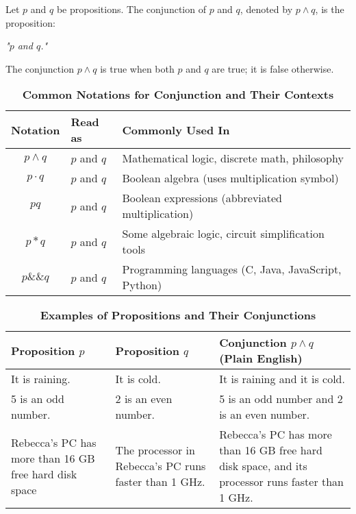 \vspace{5pt}
\begin{tcolorbox}[title=Definition: Conjunction]
Let $p$ and $q$ be propositions. The conjunction of $p$ and $q$, denoted by $p \land q$, is the proposition:  
\begin{center}
\textit{"$p$ and $q$."}
\end{center}
The conjunction $p \land q$ is true when both $p$ and $q$ are true; it is false otherwise.
\end{tcolorbox}
\begin{table}[h!]
\centering
\caption*{\textbf{Common Notations for Conjunction and Their Contexts}}
\begin{tabular}{|c|l|l|}
\hline
\rowcolor{gray!20}
\textbf{Notation} & \textbf{Read as} & \textbf{Commonly Used In} \\
\hline
$p \land q$ & $p$ and $q$ & Mathematical logic, discrete math, philosophy \\
$p \cdot q$ & $p$ and $q$ & Boolean algebra (uses multiplication symbol) \\
$pq$ & $p$ and $q$ & Boolean expressions (abbreviated multiplication) \\
$p * q$ & $p$ and $q$ & Some algebraic logic, circuit simplification tools \\
$p \&\& q$ & $p$ and $q$ & Programming languages (C, Java, JavaScript, Python) \\
\hline
\end{tabular}
\end{table}
\begin{table}[h!]
\centering
\caption*{\textbf{Examples of Propositions and Their Conjunctions}}
\begin{tabular}{|p{4.5cm}|p{4.5cm}|p{6cm}|}
\hline
\rowcolor{gray!20}
\textbf{Proposition $p$} & \textbf{Proposition $q$} & \textbf{Conjunction $p \land q$ (Plain English)} \\
\hline
It is raining. & It is cold. & It is raining and it is cold. \\
5 is an odd number. & 2 is an even number. & 5 is an odd number and 2 is an even number. \\
\hline
Rebecca’s PC has more than 16 GB free hard disk space & The processor in Rebecca’s PC runs faster than 1 GHz. & Rebecca’s PC has more than 16 GB free hard disk space, and its processor runs faster than 1 GHz. \\ \hline
\end{tabular}
\end{table}
